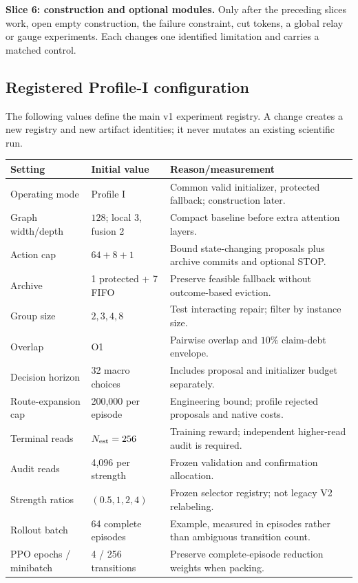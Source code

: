 \documentclass[11pt,a4paper]{article}
\theoremstyle{definition}\newtheorem{definition}[proposition]{Definition}
\begin{document}
\textbf{Slice 6: construction and optional modules.} Only after the preceding slices work, open empty construction, the failure constraint, cut tokens, a global relay or gauge experiments. Each changes one identified limitation and carries a matched control.

\subsection{Registered Profile-I configuration}
The following values define the main v1 experiment registry. A change creates a new registry and new artifact identities; it never mutates an existing scientific run.

{\small\begin{longtable}{@{}P{.30\textwidth}P{.20\textwidth}P{.43\textwidth}@{}}
\toprule
Setting & Initial value & Reason/measurement\\\midrule\endhead
Operating mode & Profile I & Common valid initializer, protected fallback; construction later.\\
Graph width/depth & $128$; local 3, fusion 2 & Compact baseline before extra attention layers.\\
Action cap & $64+8+1$ & Bound state-changing proposals plus archive commits and optional STOP.\\
Archive & 1 protected + 7 FIFO & Preserve feasible fallback without outcome-based eviction.\\
Group size & $2,3,4,8$ & Test interacting repair; filter by instance size.\\
Overlap & O1 & Pairwise overlap and $10\%$ claim-debt envelope.\\
Decision horizon & 32 macro choices & Includes proposal and initializer budget separately.\\
Route-expansion cap & 200,000 per episode & Engineering bound; profile rejected proposals and native costs.\\
Terminal reads & $N_{\rm est}=256$ & Training reward; independent higher-read audit is required.\\
Audit reads & 4,096 per strength & Frozen validation and confirmation allocation.\\
Strength ratios & $(0.5,1,2,4)$ & Frozen selector registry; not legacy V2 relabeling.\\
Rollout batch & 64 complete episodes & Example, measured in episodes rather than ambiguous transition count.\\
PPO epochs / minibatch & 4 / 256 transitions & Preserve complete-episode reduction weights when packing.\\

\end{longtable}}
\end{document}
